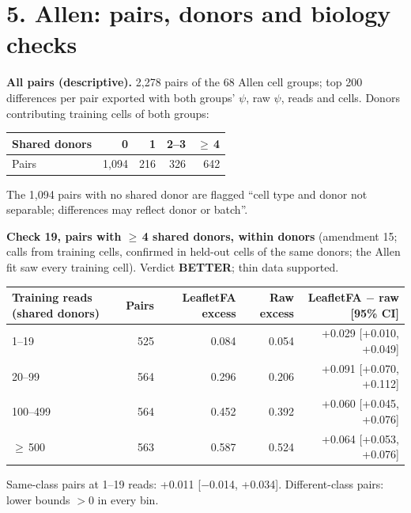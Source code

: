 \documentclass[10pt]{article}
\newcommand{\m}{$-$}
\newcommand{\gee}{$\geq$\,}
\begin{document}
\clearpage
\section*{5. Allen: pairs, donors and biology checks}
\textbf{All pairs (descriptive).} 2,278 pairs of the 68 Allen cell groups; top 200 differences per pair exported with both
groups' $\psi$, raw $\psi$, reads and cells. Donors contributing training cells of both groups:

\footnotesize
\begin{tabular}{lrrrr}
\toprule
Shared donors & 0 & 1 & 2--3 & \gee4 \\
\midrule
Pairs & 1,094 & 216 & 326 & 642 \\
\bottomrule
\end{tabular}
\normalsize

The 1,094 pairs with no shared donor are flagged ``cell type and donor not separable; differences may reflect donor or batch''.

\textbf{Check 19, pairs with \gee4 shared donors, within donors} (amendment 15; calls from training cells, confirmed in
held-out cells of the same donors; the Allen fit saw every training cell). Verdict \textbf{BETTER}; thin data supported.

\footnotesize
\begin{tabular}{lrrrr}
\toprule
Training reads (shared donors) & Pairs & LeafletFA excess & Raw excess & LeafletFA $-$ raw [95\% CI] \\
\midrule
1--19 & 525 & 0.084 & 0.054 & +0.029 [+0.010, +0.049] \\
20--99 & 564 & 0.296 & 0.206 & +0.091 [+0.070, +0.112] \\
100--499 & 564 & 0.452 & 0.392 & +0.060 [+0.045, +0.076] \\
\gee500 & 563 & 0.587 & 0.524 & +0.064 [+0.053, +0.076] \\
\bottomrule
\end{tabular}
\normalsize

Same-class pairs at 1--19 reads: +0.011 [\m0.014, +0.034]. Different-class pairs: lower bounds $>0$ in every bin.
\end{document}
